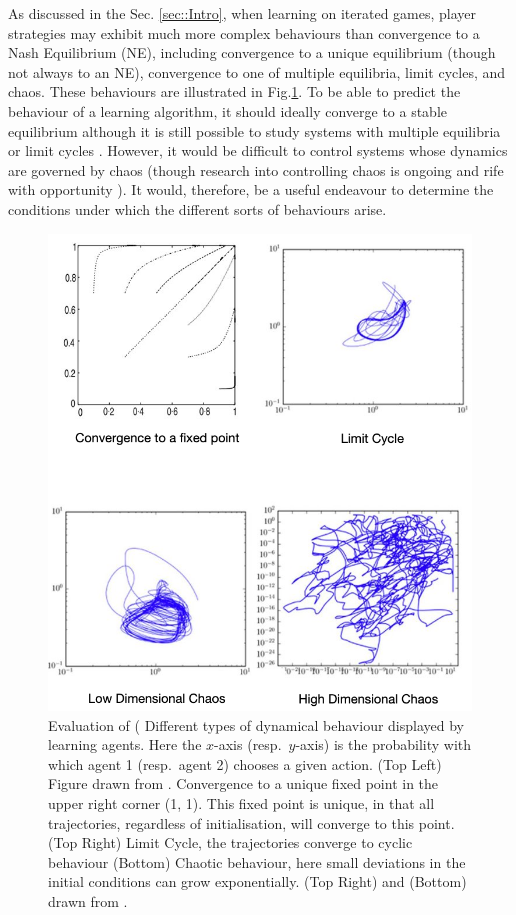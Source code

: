 \documentclass[sigconf,anonymous]{aamas}
\begin{document}
    As discussed in the Sec. \ref{sec::Intro}, when learning on iterated
    games, player strategies may exhibit much more complex behaviours
    than convergence to a Nash Equilibrium (NE), including convergence
    to a unique equilibrium (though not always to an NE), convergence
    to one of multiple equilibria, limit cycles, and chaos. These
    behaviours are illustrated in
    Fig.\ref{fig::DynamicalBehaviours}. To be able to predict the
    behaviour of a learning algorithm, it should ideally converge to a
    stable equilibrium although it is still possible to study systems
    with multiple equilibria or limit cycles
    \cite{Strogatz2000}. However, it would be difficult to control
    systems whose dynamics are governed by chaos (though research into
    controlling chaos is ongoing and rife with opportunity
    \cite{Fradkov2009}). It would, therefore, be a useful endeavour to
    determine the conditions under which the different sorts of behaviours
    arise.
%
    \begin{figure}[t]
    \centering
    \includegraphics[width = .85\linewidth]{Figures/DynamicalBehaviours.png}
    \caption{Evaluation of (\label{fig::DynamicalBehaviours} Different types of dynamical behaviour
       displayed
        by learning agents. Here the $x$-axis (resp.~$y$-axis) is the probability with which agent 1 (resp.~agent 2) chooses a given action. (Top Left) Figure drawn from \cite{Tuyls2006AnGames}.
        Convergence
        to a unique fixed point in the upper right corner (1, 1). This fixed point is unique, in
        that all trajectories, regardless of initialisation, will converge to this point. (Top Right) Limit Cycle, the trajectories converge to cyclic behaviour (Bottom)
        Chaotic behaviour, here small deviations in the initial conditions can grow
        exponentially. (Top Right) and (Bottom) drawn from \cite{Sanders2018}.}
\end{figure}
\end{document}
